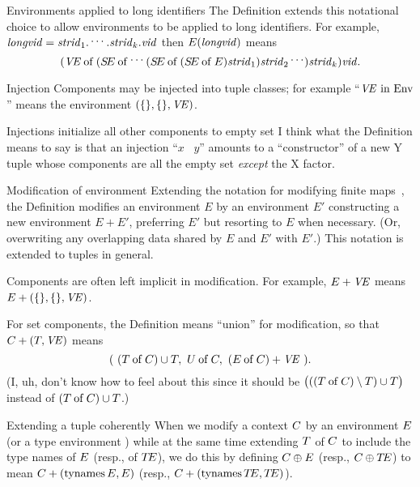 \begin{convention}{Environments applied to long identifiers}
The Definition extends this notational choice to allow environments to
be applied to long identifiers. For example,$\textit{longvid\/} = \textit{strid\/}_1.\mathinner{{}^{\textstyle .\,.\,.}}.\textit{strid\/}_k.\textit{vid\/}$ then
$E(\textit{longvid\/})$ means
\begin{equation*}
   (\textit{V\kern-.05emE\/} \mathbin{\rm of} (\mbox{$S\!E$} \mathbin{\rm of} \mathinner{{}^{\textstyle .\,.\,.}}(\mbox{$S\!E$} \mathbin{\rm of} (\mbox{$S\!E$} \mathbin{\rm of} E)\textit{strid\/}_1
                   )\textit{strid\/}_2\mathinner{{}^{\textstyle .\,.\,.}}
        )\textit{strid\/}_k
    )\textit{vid\/}.
\end{equation*}
\end{convention}

\begin{definition}{Injection}
Components may be injected into tuple classes; for example
``$\textit{V\kern-.05emE\/}\ \mbox{\rm in}\ {\rm Env}$'' means the environment
$(\{\},\{\},\textit{V\kern-.05emE\/})$.
\end{definition}

\begin{remark}{Injections initialize all other components to empty set}
I think what the Definition means to say is that an injection ``$x$ \In\ $y$''
amounts to a ``constructor'' of a new Y tuple whose components are all
the empty set \emph{except} the X factor.
\end{remark}

\begin{convention}{Modification of environment}
Extending the notation for modifying finite maps~,
the Definition modifies an environment $E$ by an environment $E'$
constructing a new environment $E+E'$, preferring $E'$ but resorting to
$E$ when necessary. (Or, overwriting any overlapping data shared by $E$
and $E'$ with $E'$.) This notation is extended to
tuples in general.

Components are often left implicit in modification. For example, $E+\textit{V\kern-.05emE\/}$
means $E+(\{\},\{\},\textit{V\kern-.05emE\/})$.

For set components, the Definition means ``union'' for modification, so
that $C+(T,\textit{V\kern-.05emE\/})$ means
\begin{equation*}
(\ (\of{\T}{\C})\cup\T,\ \of{\U}{\C},\ (\of{\E}{\C})+\VE\ ).
\end{equation*}
(I, uh, don't know how to feel about this since it should be $\bigl(((T \mathbin{\rm of} C)\setminus T)\cup T\bigr)$
instead of $(T \mathbin{\rm of} C)\cup T$.)
\end{convention}

\begin{definition}{Extending a tuple coherently}
When we modify a context $C$ by an environment $E$ (or a type
environment \TE) while at the same time extending $T$ of $C$ to
include the type names of $E$ (resp., of $\mbox{$T\!E$}$), we do this by defining
$C\oplus E$ (resp., $C\oplus\mbox{$T\!E$}$) to mean
$C+(\mathop{\rm tynames}\nolimits E,E)$ (resp., $C+(\mathop{\rm tynames}\nolimits\mbox{$T\!E$},\mbox{$T\!E$})$).
\end{definition}

